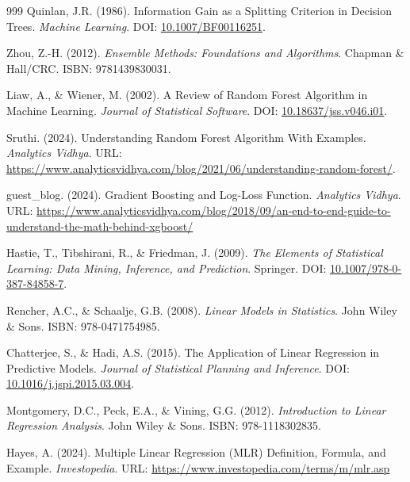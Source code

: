 \documentclass[12pt, a4paper,oneside]{book}
\numberwithin{equation}{section}
\begin{document}
\begin{thebibliography}{999}
Quinlan, J.R. (1986). Information Gain as a Splitting Criterion in Decision Trees. \textit{Machine Learning}. DOI: \href{https://doi.org/10.1007/BF00116251}{10.1007/BF00116251}.

Zhou, Z.-H. (2012). \textit{Ensemble Methods: Foundations and Algorithms}. Chapman \& Hall/CRC. ISBN: 9781439830031.

Liaw, A., \& Wiener, M. (2002). A Review of Random Forest Algorithm in Machine Learning. \textit{Journal of Statistical Software}. DOI: \href{https://doi.org/10.18637/jss.v046.i01}{10.18637/jss.v046.i01}.

Sruthi. (2024). Understanding Random Forest Algorithm With Examples. \textit{Analytics Vidhya}. URL: \href{https://www.analyticsvidhya.com/blog/2021/06/understanding-random-forest/}{https://www.analyticsvidhya.com/blog/2021/06/understanding-random-forest/}.

guest\_blog. (2024). Gradient Boosting and Log-Loss Function. \textit{Analytics Vidhya}. URL: \href{https://www.analyticsvidhya.com/blog/2018/09/an-end-to-end-guide-to-understand-the-math-behind-xgboost/}{https://www.analyticsvidhya.com/blog/2018/09/an-end-to-end-guide-to-understand-the-math-behind-xgboost/}

Hastie, T., Tibshirani, R., \& Friedman, J. (2009). \textit{The Elements of Statistical Learning: Data Mining, Inference, and Prediction}. Springer. DOI: \href{https://doi.org/10.1007/978-0-387-84858-7}{10.1007/978-0-387-84858-7}.

Rencher, A.C., \& Schaalje, G.B. (2008). \textit{Linear Models in Statistics}. John Wiley \& Sons. ISBN: 978-0471754985.


Chatterjee, S., \& Hadi, A.S. (2015). The Application of Linear Regression in Predictive Models. \textit{Journal of Statistical Planning and Inference}. DOI: \href{https://doi.org/10.1016/j.jspi.2015.03.004}{10.1016/j.jspi.2015.03.004}.

Montgomery, D.C., Peck, E.A., \& Vining, G.G. (2012). \textit{Introduction to Linear Regression Analysis}. John Wiley \& Sons. ISBN: 978-1118302835.

Hayes, A. (2024). Multiple Linear Regression (MLR) Definition, Formula, and Example. \textit{Investopedia}. URL: \href{https://www.investopedia.com/terms/m/mlr.asp}{https://www.investopedia.com/terms/m/mlr.asp}


\end{thebibliography}
\end{document}
